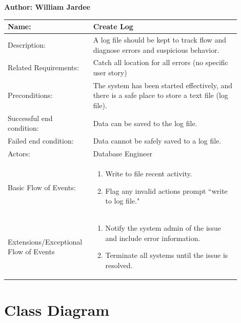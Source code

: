 \documentclass[11pt]{article}
\begin{document}
\begin{table}[!ht]
\begin{center}
\textbf{Author: William Jardee}
\vspace*{1em}

\begin{tabular}{p{0.30\linewidth}p{0.60\linewidth}}
	Name: & Create Log\\\hline
	Description: & A log file should be kept to track flow and diagnose errors and suspicious behavior.\\\hline
	Related Requirements:& Catch all location for all errors (no specific user story)\\\hline
	Preconditions:& The system has been started effectively, and there is a safe place to store a text file (log file).\\\hline
	Successful end condition:& Data can be saved to the log file.\\\hline
	Failed end condition:& Data cannot be safely saved to a log file.\\\hline
	Actors:& Database Engineer \\\hline
	Basic Flow of Events: & \begin{enumerate}
	\item Write to file recent activity.
	\item Flag any invalid actions prompt ``write to log file."
	\end{enumerate}\\\hline
	Extensions/Exceptional Flow of Events & \begin{enumerate}
	\item Notify the system admin of the issue and include error information.
	\item Terminate all systems until the issue is resolved.
	\end{enumerate}
\end{tabular}
\label{des:create_log}
\end{center}
\end{table}

\clearpage



\section*{Class Diagram}
\end{document}

